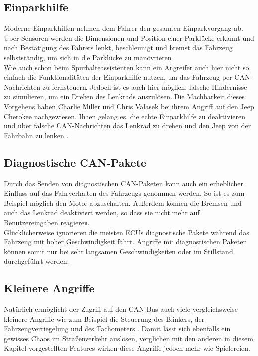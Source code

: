 \subsection{Einparkhilfe}
Moderne Einparkhilfen nehmen dem Fahrer den gesamten Einparkvorgang ab. Über Sensoren werden die Dimensionen und Position einer Parklücke erkannt und nach Bestätigung des Fahrers lenkt, beschleunigt und bremst das Fahrzeug selbstständig, um sich in die Parklücke zu manövrieren.\\
Wie auch schon beim Spurhalteassistenten kann ein Angreifer auch hier nicht so einfach die Funktionalitäten der Einparkhilfe nutzen, um das Fahrzeug per \acs{CAN}-Nachrichten zu fernsteuern. Jedoch ist es auch hier möglich, falsche Hindernisse zu simulieren, um ein Drehen des Lenkrads auszulösen. Die Machbarkeit dieses Vorgehens haben Charlie Miller und Chris Valasek bei ihrem Angriff auf den Jeep Cherokee nachgewiesen. Ihnen gelang es, die echte Einparkhilfe zu deaktivieren und über falsche \acs{CAN}-Nachrichten das Lenkrad zu drehen und den Jeep von der Fahrbahn zu lenken \cite{Miller.2015}.

\subsection{Diagnostische CAN-Pakete}
Durch das Senden von diagnostischen \acs{CAN}-Paketen kann auch ein erheblicher Einfluss auf das Fahrverhalten des Fahrzeugs genommen werden. So ist es zum Beispiel möglich den Motor abzuschalten. Außerdem können die Bremsen und auch das Lenkrad deaktiviert werden, so dass sie nicht mehr auf Benutzereingaben reagieren. \\
Glücklicherweise ignorieren die meisten \acsp{ECU} diagnostische Pakete während das Fahrzeug mit hoher Geschwindigkeit fährt. Angriffe mit diagnostischen Paketen können somit nur bei sehr langsamen Geschwindigkeiten oder im Stillstand durchgeführt werden.

\subsection{Kleinere Angriffe}
Natürlich ermöglicht der Zugriff auf den \acs{CAN}-Bus auch viele vergleichsweise kleinere Angriffe wie zum Beispiel die Steuerung des Blinkers, der Fahrzeugverriegelung und des Tachometers \cite[84]{Miller.2015}. Damit lässt sich ebenfalls ein gewisses Chaos im Straßenverkehr auslösen, verglichen mit den anderen in diesem Kapitel vorgestellten Features wirken diese Angriffe jedoch mehr wie Spielereien.


